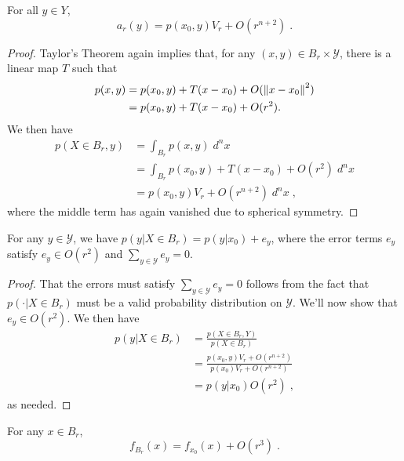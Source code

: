 	\begin{lm}
		For all $y\in Y$,
		\begin{equation}
			a_r(y) = p(x_0,y)V_r + O(r^{n+2})\;.
		\end{equation}
	\end{lm}
	\begin{proof}
		Taylor's Theorem again implies that, for any $(x,y)\in B_r \times \mathcal{Y}$, there is a linear map $T$ such that
		\begin{align}
			p(x,y) &= p(x_0,y) + T(x - x_0) + O(\left\lVert x - x_0\right\rVert^2) \\
			&= p(x_0,y) + T(x - x_0) + O(r^2). 
		\end{align}
		We then have 
		\begin{align}
			p(X \in B_r, y) &= \int_{B_r} p(x,y) \; d^n x \\ 
			&= \int_{B_r} p(x_0,y) + T(x - x_0) + O(r^2) \; d^n x \\
			&= p(x_0,y)V_r + O(r^{n+2}) \; d^n x\;,
		\end{align}
		where the middle term has again vanished due to spherical symmetry. 
	\end{proof}
	\begin{lm}
		For any $y \in \mathcal{Y}$, we have $p(y|X \in B_r) = p(y|x_0) + e_y$, where the error terms $e_y$ satisfy $e_y \in O(r^2)$ and $\sum_{y \in \mathcal{Y}} e_y = 0$. 
	\end{lm}
	\begin{proof}
		That the errors must satisfy $\sum_{y \in \mathcal{Y}} e_y = 0$ follows from the fact that $p(\cdot| X \in B_r)$ must be a valid probability distribution on $\mathcal{Y}$. We'll now show that $e_y \in O(r^2)$. We then have 
		\begin{align}
			p(y|X \in B_r) &= \frac{p(X \in B_r, Y)}{p(X\in B_r)} \\
			&= \frac{p(x_0, y)V_r + O(r^{n+2})}{p(x_0)V_r + O(r^{n+2})} \\
			&= p(y|x_0)  O(r^{2}) \tag{$V_r \propto r^n$}\;,
		\end{align}
		as needed. 
	\end{proof}
	\begin{lm}
		For any $x \in B_r$, 
		\begin{equation}
			f_{B_r}(x) = f_{x_0}(x) + O(r^3)\;.
		\end{equation}
	\end{lm}
